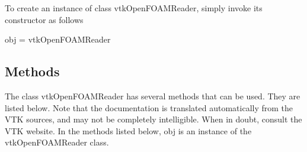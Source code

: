 To create an instance of class vtk\-Open\-F\-O\-A\-M\-Reader, simply invoke its constructor as follows \begin{DoxyVerb}  obj = vtkOpenFOAMReader
\end{DoxyVerb}
 \hypertarget{vtkwidgets_vtkxyplotwidget_Methods}{}\subsection{Methods}\label{vtkwidgets_vtkxyplotwidget_Methods}
The class vtk\-Open\-F\-O\-A\-M\-Reader has several methods that can be used. They are listed below. Note that the documentation is translated automatically from the V\-T\-K sources, and may not be completely intelligible. When in doubt, consult the V\-T\-K website. In the methods listed below, {\ttfamily obj} is an instance of the vtk\-Open\-F\-O\-A\-M\-Reader class. 
